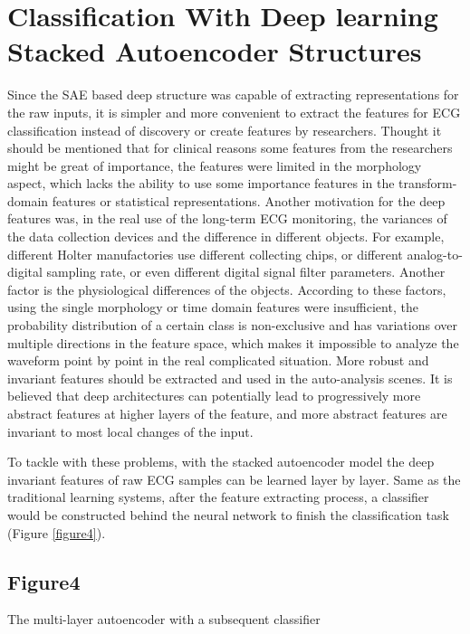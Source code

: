 \documentclass{bmcart}
\begin{document}
\section*{Classification With Deep learning Stacked Autoencoder Structures}
Since the SAE based deep structure was capable of extracting representations for the raw inputs, it is simpler and more convenient to extract the features for ECG classification instead of discovery or create features by researchers. Thought it should be mentioned that for clinical reasons some features from the researchers might be great of importance, the features were limited in the morphology aspect, which lacks the ability to use some importance features in the transform-domain features or statistical representations. Another motivation for the deep features was, in the real use of the long-term ECG monitoring, the variances of the data collection devices and the difference in different objects. For example, different Holter manufactories use different collecting chips, or different analog-to-digital sampling rate, or even different digital signal filter parameters. Another factor is the physiological differences of the objects. According to these factors, using the single morphology or time domain features were insufficient, the probability distribution of a certain class is non-exclusive and has variations over multiple directions in the feature space, which makes it impossible to analyze the waveform point by point in the real complicated situation. More robust and invariant features should be extracted and used in the auto-analysis scenes. It is believed that deep architectures can potentially lead to progressively more abstract features at higher layers of the feature, and more abstract features are invariant to most local changes of the input\cite{bengio2013representation}.

To tackle with these problems, with the stacked autoencoder model the deep invariant features of raw ECG samples can be learned layer by layer. Same as the traditional learning systems, after the feature extracting process, a classifier would be constructed behind the neural network to finish the classification task (Figure \ref{figure4}). 


\subsection*{Figure4}

The multi-layer autoencoder with a subsequent classifier
\end{document}
